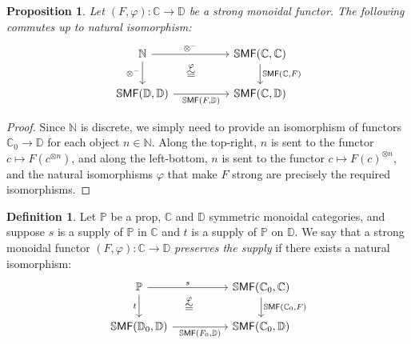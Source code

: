 \documentclass[11pt, oneside, article]{memoir}
\theoremstyle{plain}
\newtheorem{proposition}[theorem]{Proposition}
\theoremstyle{definition}
\newtheorem{definition}[theorem]{Definition}
\theoremstyle{remark}
\newcommand{\Cat}[1]{{\mathsf{#1}}}%
\newcommand{\CCat}[1]{\mathbb{\StrLeft{#1}{1}}\Cat{\StrGobbleLeft{#1}{1}}}%
\newcommand{\tpow}[1]{^{\otimes #1}}
\newcommand{\ssmf}{\CCat{SMF}}
\newcommand{\cc}{\mathbb{C}}
\newcommand{\dd}{\mathbb{D}}
\newcommand{\nn}{\mathbb{N}}
\newcommand{\pp}{\mathbb{P}}
\newcommand{\mob}[1]{#1_0}
\begin{document}
\begin{proposition}\label{prop.nat_strong_isos}
Let $(F,\varphi)\colon\cc\to\dd$ be a strong monoidal functor. The following commutes up to natural isomorphism:
\[
\begin{tikzcd}[column sep=50pt]
	\nn\ar[r, "\otimes^-"]\ar[d, "\otimes^-"']&
	\ssmf(\cc,\cc)\ar[d, "{\ssmf(\cc,F)}"]\\
	\ssmf(\dd,\dd)\ar[r, "{\ssmf(F,\dd)}"']&
	\ssmf(\cc,\dd)\ar[ul, phantom, "\overset{\varphi}{\cong}"]
\end{tikzcd}
\]
\end{proposition}
\begin{proof}
Since $\nn$ is discrete, we simply need to provide an isomorphism of functors $\cc_0\to\dd$ for each object $n\in\nn$. Along the top-right, $n$ is sent to the functor $c\mapsto F(c\tpow{n})$, and along the left-bottom, $n$ is sent to the functor $c\mapsto F(c)\tpow{n}$, and the natural isomorphisms $\varphi$ that make $F$ strong are precisely the required isomorphisms.
\end{proof}

\begin{definition}\label{def.preserve_supply}
Let $\pp$ be a prop, $\cc$ and $\dd$ symmetric monoidal categories, and suppose $s$ is a supply of $\pp$ in $\cc$ and $t$ is a supply of $\pp$ on $\dd$. We say that a strong monoidal functor $(F,\varphi)\colon\cc\to\dd$ \emph{preserves the supply} if there exists a natural isomorphism:
\begin{equation}\label{eqn.pres_supply}
\begin{tikzcd}[column sep=50pt]
	\pp\ar[r, "s"]\ar[d, "t"']&
	\ssmf(\mob{\cc},\cc)\ar[d, "{\ssmf(\mob{\cc},F)}"]\\
	\ssmf(\mob{\dd},\dd)\ar[r, "{\ssmf(\mob{F},\dd)}"']&
	\ssmf(\mob{\cc},\dd)\ar[ul, phantom, "\overset{\varphi}{\cong}"]
\end{tikzcd}
\end{equation}
\end{definition}
\end{document}
